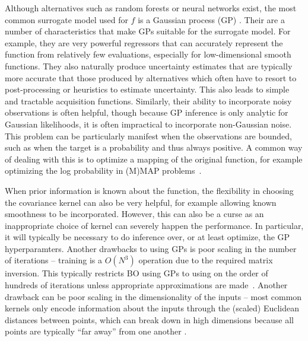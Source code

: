 Although alternatives such as random forests \citep{bergstra2011algorithms,hutter2011sequential} 
or neural networks \citep{snoek2015scalable} exist, the most common surrogate model used for 
$f$ is a Gaussian process (GP) \citep{rasmussen2006gaussian}.  Their are a number
of characteristics that make GPs suitable for the surrogate model.  For example, they are very powerful
regressors that can accurately represent the function from relatively few evaluations, especially
for low-dimensional smooth functions.  They also naturally produce uncertainty estimates
that are typically more accurate that those produced by alternatives which often
have to resort to post-processing or heuristics to estimate uncertainty.
This also leads to simple and tractable acquisition functions.  Similarly, their ability to incorporate
noisy observations is often helpful, though because GP inference is only analytic for Gaussian
likelihoods, it is often impractical to incorporate non-Gaussian noise.  This problem can be
particularly manifest when the observations are bounded, such as when the target is a probability
and thus always positive.  A common way of dealing with this is to optimize a mapping of the
original function, for example optimizing the log probability in (M)MAP problems~\citep{osborne2010bayesian}.

When prior information is known about the function, the
flexibility in choosing the covariance kernel can also be very helpful, for example allowing known
smoothness to be incorporated.  However, this can also be a curse as an inappropriate choice of
kernel can severely happen the performance.  In particular, it will typically be necessary to
do inference over, or at least optimize, the GP hyperparamters.  Another drawbacks to using GPs
is poor scaling in the number of iterations -- training is a $O(N^3)$ operation due to the required
matrix inversion.  This typically restricts BO using GPs to using on the order of hundreds of iterations
unless appropriate approximations are made~\citep{snelson2006sparse,hensman2013gaussian}.
Another drawback can be poor scaling in the dimensionality of the inputs -- most common kernels
only encode information about the inputs through the (scaled) Euclidean distances between points,
which can break down in high dimensions because all points are typically
``far away'' from one another \citep{bengio2006curse}.  

